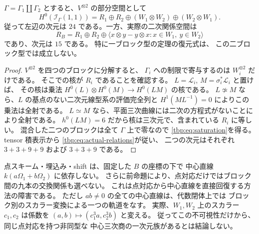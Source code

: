 \begin{proposition}[点対応の双線型イデアルは二次関係より大きい]
\label{tbp:prop:quadratic-saturation}
$\Gamma=\Gamma_1\amalg\Gamma_2$ とすると、$V^{\otimes2}$ の部分空間として
\begin{equation}\label{tbp:eq:saturation}
 H^0(\mathcal I_\Gamma(1,1))
 =R_1\oplus R_2\oplus(W_1\otimes W_2)\oplus(W_2\otimes W_1).
\end{equation}
従って左辺の次元は $24$ である。一方、実際の二次関係空間は
\begin{equation}\label{tbp:eq:actual-relations}
 R_B=R_1\oplus R_2\oplus
 \langle x\otimes y-y\otimes x:
         x\in W_1,\ y\in W_2\rangle
\end{equation}
であり、次元は $15$ である。
特に一ブロック型の定理の復元式は、
この二ブロック型では成立しない。
\end{proposition}

\begin{proof}
$V^{\otimes2}$ を四つのブロックに分解すると、
$\Gamma_i$ への制限で寄与するのは $W_i^{\otimes2}$ だけである。
そこでの核が $R_i$ であることを確認する。
$L=\mathcal L_i$, $M=\sigma_i^*\mathcal L_i$ と置けば、
その核は乗法
$H^0(L)\otimes H^0(M)\to H^0(LM)$ の核である。
$L\not\simeq M$ なら、$L$ の基点のない二次元線型系の評価完全列と
$H^1(ML^{-1})=0$ によりこの乗法は全射である。
$L\simeq M$ なら、平面三次曲線には二次の方程式がないことにより全射である。
$h^0(LM)=6$ だから核は三次元で、含まれている $R_i$ に等しい。
混合した二つのブロックは全て $\Gamma$ 上で零なので
\eqref{tbp:eq:saturation}を得る。
tensor 積表示から \eqref{tbp:eq:actual-relations}が従い、
二つの次元はそれぞれ $3+3+9+9$ および $3+3+9$ である。
\end{proof}

\begin{remark}[中心直線の不可視性の意味]\label{tbp:rem:pencil}
点スキーム・埋込み・shift は、固定した $B$ の座標の下で
中心直線 $k(a\Omega_1+b\Omega_2)$ に依存しない。
さらに前命題により、点対応だけではブロック間の九本の交換関係も選べない。
これは点対応から中心直線を直接回復する方法の障害である。
ただし $ab\ne0$ の全ての中心直線は、代数閉体上では
ブロック別のスカラー変換による一つの軌道をなす。
実際、$W_1,W_2$ 上のスカラー $c_1,c_2$ は係数を
$(a,b)\mapsto(c_1^3a,c_2^3b)$ と変える。
従ってこの不可視性だけから、同じ点対応を持つ非同型な
中心三次商の一次元族があるとは結論しない。
\end{remark}

